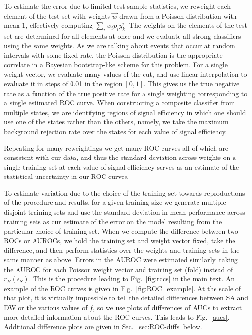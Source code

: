 To estimate the error due to limited test sample statistics, we reweight each element of the test set with weights $\vec{w}$ drawn from a Poisson distribution with mean $1$, effectively computing $ \sum_i w_i p_i y_k^i$. The weights on the elements of the test set are determined for all elements at once and we  evaluate all strong classifiers using the same weights. As we are talking about events that occur at random intervals with some fixed rate, the Poisson distribution is the appropriate correlate in a Bayesian bootstrap-like scheme for this problem. For a single weight vector, we evaluate many values of the cut, and use linear interpolation to evaluate it in steps of 0.01 in the region $[0,1]$. This gives us the true negative rate as a function of the true positive rate for a single weighting corresponding  to a single estimated ROC curve.  When constructing a composite classifier from multiple states, we are identifying regions of signal efficiency in which one should use one of the states rather than the others, namely, we take the maximum background rejection rate over the states for each value of signal efficiency.

Repeating for many reweightings we get many ROC curves all of which are consistent with our data, and thus the standard deviation across weights on a single training set at each value of signal efficiency serves as an estimate of the statistical uncertainty in our ROC curves.

To estimate variation due to the choice of the training set  towards  reproductions of the procedure and results, for a given training size we generate multiple disjoint training sets and use the standard deviation in mean performance across training sets as our estimate of the error on the model resulting from the particular choice of training set. When we compute the difference between two ROCs or AUROCs, we hold the training set and weight vector fixed, take the difference, and then perform statistics over the weights and training sets in the same manner as above. Errors in the AUROC were estimated similarly, taking the AUROC for each Poisson weight vector and training set (fold) instead of $r_B(\epsilon_S)$. This is the procedure leading to Fig.~\ref{fig:rocs} in the main text. An example of the ROC curves is given in Fig.~\ref{fig:ROC_example}. At the scale of that plot, it is virtually impossible to tell the detailed differences between SA and DW or the various values of $f$, so we use plots of differences of AUCs to extract more detailed information about the ROC curves. This leads to Fig.~\ref{aucs}. Additional difference plots are given in Sec.~\ref{sec:ROC-diffs} below.

